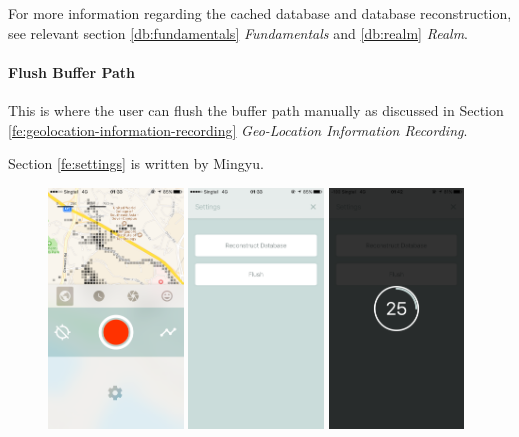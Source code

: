 \documentclass[12pt,a4paper]{article}
\begin{document}
            For more information regarding the cached database and database reconstruction, see relevant section \ref{db:fundamentals} \textit{Fundamentals} and \ref{db:realm} \textit{Realm}.
            
            \paragraph{Flush Buffer Path}
            This is where the user can flush the buffer path manually as discussed in Section \ref{fe:geolocation-information-recording} \textit{Geo-Location Information Recording}.
            
            \footnotesize
            Section \ref{fe:settings} is written by Mingyu.
            \normalsize
            
            
            \begin{figure}
                \includegraphics[width=0.32\textwidth]{4-1-8-a}
                \includegraphics[width=0.32\textwidth]{4-1-8-b}
                \includegraphics[width=0.32\textwidth]{4-1-8-c}

\end{figure}
\end{document}
